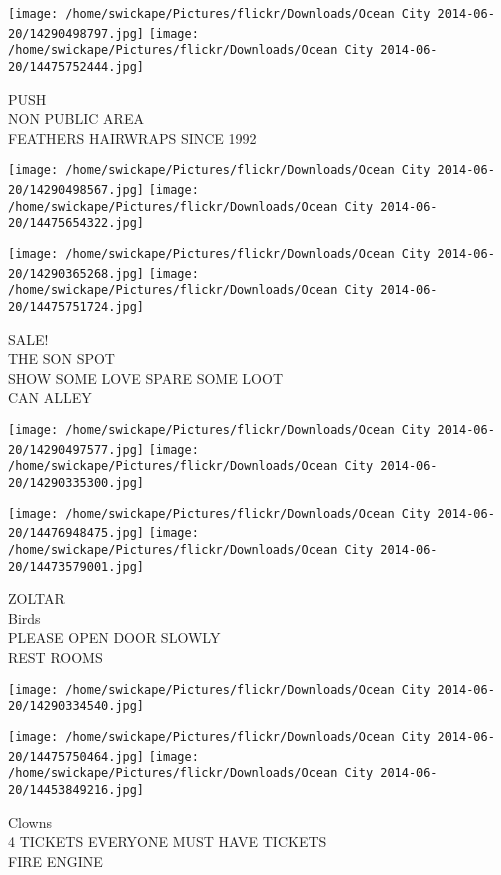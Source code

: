 \documentclass[10pt,letterpaper]{article}
\begin{document}
\vspace{0.25in}
\texttt{[image: /home/swickape/Pictures/flickr/Downloads/Ocean City 2014-06-20/14290498797.jpg]}
\texttt{[image: /home/swickape/Pictures/flickr/Downloads/Ocean City 2014-06-20/14475752444.jpg]}

PUSH\\
NON PUBLIC AREA\\
FEATHERS HAIRWRAPS SINCE 1992
\pagebreak

\texttt{[image: /home/swickape/Pictures/flickr/Downloads/Ocean City 2014-06-20/14290498567.jpg]}
\texttt{[image: /home/swickape/Pictures/flickr/Downloads/Ocean City 2014-06-20/14475654322.jpg]}

\texttt{[image: /home/swickape/Pictures/flickr/Downloads/Ocean City 2014-06-20/14290365268.jpg]}
\texttt{[image: /home/swickape/Pictures/flickr/Downloads/Ocean City 2014-06-20/14475751724.jpg]}

SALE!\\
THE SON SPOT\\
SHOW SOME LOVE SPARE SOME LOOT\\
CAN ALLEY
\pagebreak

\texttt{[image: /home/swickape/Pictures/flickr/Downloads/Ocean City 2014-06-20/14290497577.jpg]}
\texttt{[image: /home/swickape/Pictures/flickr/Downloads/Ocean City 2014-06-20/14290335300.jpg]}

\texttt{[image: /home/swickape/Pictures/flickr/Downloads/Ocean City 2014-06-20/14476948475.jpg]}
\texttt{[image: /home/swickape/Pictures/flickr/Downloads/Ocean City 2014-06-20/14473579001.jpg]}

ZOLTAR\\
Birds\\
PLEASE OPEN DOOR SLOWLY\\
REST ROOMS
\pagebreak

\texttt{[image: /home/swickape/Pictures/flickr/Downloads/Ocean City 2014-06-20/14290334540.jpg]}

\vspace{0.25in}
\texttt{[image: /home/swickape/Pictures/flickr/Downloads/Ocean City 2014-06-20/14475750464.jpg]}
\texttt{[image: /home/swickape/Pictures/flickr/Downloads/Ocean City 2014-06-20/14453849216.jpg]}

Clowns\\
4 TICKETS EVERYONE MUST HAVE TICKETS\\
FIRE ENGINE
\pagebreak
\end{document}
